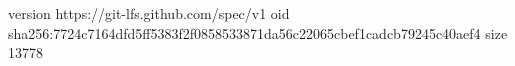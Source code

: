 version https://git-lfs.github.com/spec/v1
oid sha256:7724c7164dfd5ff5383f2f0858533871da56c22065cbef1cadcb79245c40aef4
size 13778
